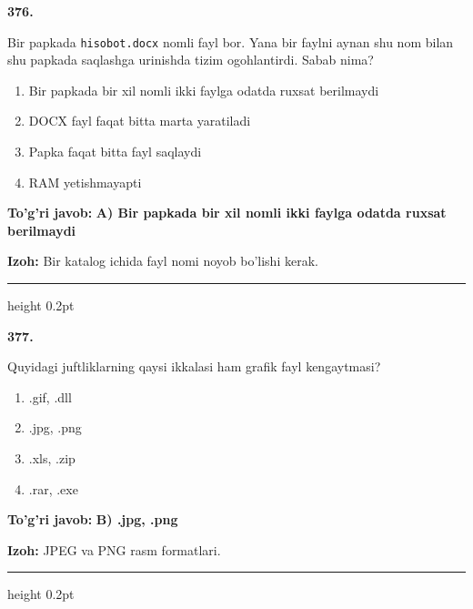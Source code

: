 \documentclass[10pt,a4paper]{article}
\begin{document}
{\bfseries\sffamily\color{ink} 376.}
\par
Bir papkada \texttt{hisobot.docx} nomli fayl bor. Yana bir faylni aynan shu nom bilan shu papkada saqlashga urinishda tizim ogohlantirdi. Sabab nima?
\begin{enumerate}[label=\Alph*),leftmargin=9mm]
\item Bir papkada bir xil nomli ikki faylga odatda ruxsat berilmaydi
\item DOCX fayl faqat bitta marta yaratiladi
\item Papka faqat bitta fayl saqlaydi
\item RAM yetishmayapti
\end{enumerate}
\begin{tcolorbox}[enhanced,breakable,colback=teal!4,colframe=teal!60!black,boxrule=0.45pt,arc=1.2mm,left=2.7mm,right=2.7mm,top=1.8mm,bottom=1.8mm,before skip=2mm,after skip=2mm]
{\bfseries\sffamily\color{teal}To'g'ri javob:} \textbf{A) Bir papkada bir xil nomli ikki faylga odatda ruxsat berilmaydi}
\par\smallskip
{\bfseries Izoh:} Bir katalog ichida fayl nomi noyob bo'lishi kerak.
\end{tcolorbox}
\vspace{2mm}\hrule height 0.2pt\vspace{3mm}

{\bfseries\sffamily\color{ink} 377.}
\par
Quyidagi juftliklarning qaysi ikkalasi ham grafik fayl kengaytmasi?
\begin{enumerate}[label=\Alph*),leftmargin=9mm]
\item .gif, .dll
\item .jpg, .png
\item .xls, .zip
\item .rar, .exe
\end{enumerate}
\begin{tcolorbox}[enhanced,breakable,colback=teal!4,colframe=teal!60!black,boxrule=0.45pt,arc=1.2mm,left=2.7mm,right=2.7mm,top=1.8mm,bottom=1.8mm,before skip=2mm,after skip=2mm]
{\bfseries\sffamily\color{teal}To'g'ri javob:} \textbf{B) .jpg, .png}
\par\smallskip
{\bfseries Izoh:} JPEG va PNG rasm formatlari.
\end{tcolorbox}
\vspace{2mm}\hrule height 0.2pt\vspace{3mm}
\end{document}
